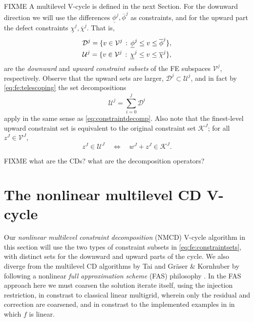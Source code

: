 \documentclass[letterpaper,final,12pt,reqno]{amsart}
\theoremstyle{cstyle}
\theoremstyle{cstyle*}
\theoremstyle{dstyle}
\numberwithin{equation}{section}
\numberwithin{figure}{section}
\numberwithin{table}{section}
\numberwithin{theorem}{section}
\begin{document}
FIXME A multilevel V-cycle is defined in the next Section.  For the downward direction we will use the differences $\underline{\phi}^j,\overline{\phi}^j$ as constraints, and for the upward part the defect constraints $\underline{\chi}^j,\overline{\chi}^j$.  That is,
\begin{align}
\mathcal{D}^j = \{v \in \mathcal{V}^j \,:\, \underline{\phi}^j \le v \le \overline{\phi}^j\}, \label{eq:fe:constraintsets} \\
\mathcal{U}^j = \{v \in \mathcal{V}^j \,:\, \underline{\chi}^j \le v \le \overline{\chi}^j\}, \notag
\end{align}
are the \emph{downward} and \emph{upward constraint subsets} of the FE subspaces $\mathcal{V}^j$, respectively.  Observe that the upward sets are larger, $\mathcal{D}^j \subset \mathcal{U}^j$, and in fact by \eqref{eq:fe:telescoping} the set decompositions
\begin{equation}
\mathcal{U}^j = \sum_{i=0}^j \mathcal{D}^i \label{eq:fe:constraintdecomp}
\end{equation}
apply in the same sense as \eqref{eq:constraintdecomp}.  Also note that the finest-level upward constraint set is equivalent to the original constraint set $\mathcal{K}^J$; for all $z^J \in \mathcal{V}^J$,
\begin{equation}
z^J \in \mathcal{U}^J \quad \iff \quad w^J+z^J \in \mathcal{K}^J. \label{eq:fe:finestlevelequivalent}
\end{equation}

FIXME what are the CDs?  what are the decomposition operators?


\section{The nonlinear multilevel CD V-cycle} \label{sec:vcycle}

Our \emph{nonlinear multilevel constraint decomposition} (NMCD) V-cycle algorithm in this section will use the two types of constraint subsets in \eqref{eq:fe:constraintsets}, with distinct sets for the downward and upward parts of the cycle.  We also diverge from the multilevel CD algorithms by Tai \cite{Tai2003} and Gr\"aser \& Kornhuber \cite[Algorithm 4.7]{GraeserKornhuber2009} by following a nonlinear \emph{full approximation scheme} (FAS) philosophy \cite{BrandtLivne2011}.  In the FAS approach here we must coarsen the solution iterate itself, using the injection restriction, in constrast to classical linear multigrid, wherein only the residual and correction are coarsened, and in constrast to the implemented examples in \cite{GraeserKornhuber2009,Tai2003} in which $f$ is linear.
\end{document}
